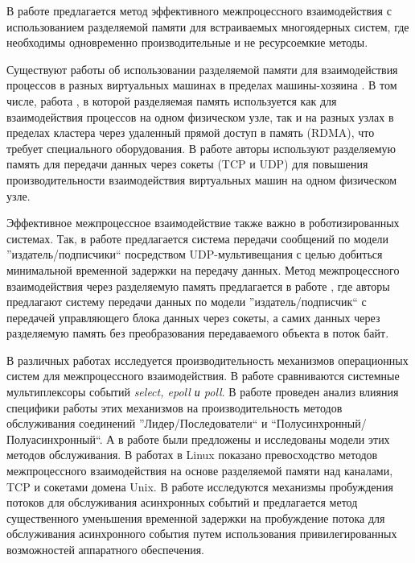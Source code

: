 В работе \cite{HPCInterCoreLinux} предлагается метод эффективного межпроцессного взаимодействия с использованием разделяемой памяти для встраиваемых многоядерных систем, где необходимы одновременно производительные и не ресурсоемкие методы.

Существуют работы об использовании разделяемой памяти для взаимодействия процессов в разных виртуальных машинах в пределах машины-хозяина \cite{IPCInterVirtualMachineShmem, IPCInterVirtualMachineShmemOptimizations, 10.1145/2847562, 10.1007/978-3-642-00955-6_7}. В том числе, работа \cite{234795}, в которой разделяемая память используется как для взаимодействия процессов на одном физическом узле, так и на разных узлах в пределах кластера через удаленный прямой доступ в память (RDMA), что требует специального оборудования. В работе \cite{7416013} авторы используют разделяемую память для передачи данных через сокеты (TCP и UDP) для повышения производительности взаимодействия виртуальных машин на одном физическом узле.

Эффективное межпроцессное взаимодействие также важно в роботизированных системах. Так, в работе \cite{5649358} предлагается система передачи сообщений по модели ''издатель/подписчики`` посредством UDP-мультивещания с целью добиться минимальной временной задержки на передачу данных. Метод межпроцессного взаимодействия через разделяемую память предлагается в работе \cite{Wang2019TZCEI}, где авторы предлагают систему передачи данных по модели ''издатель/подписчик`` с передачей управляющего блока данных через сокеты, а самих данных через разделяемую память без преобразования передаваемого объекта в поток байт.

В различных работах исследуется производительность механизмов операционных систем для межпроцессного взаимодействия. В работе \cite{MuxComparison} сравниваются системные мультиплексоры событий \textit{select, epoll и poll}. В работе \cite{AnalysisOfEventProcDesignPatterns} проведен анализ влияния специфики работы этих механизмов на производительность методов обслуживания соединений ''Лидер/Последователи`` и ``Полусинхронный/Полуасинхронный``. А в работе \cite{6298185} были предложены и исследованы модели этих методов обслуживания.
В работах \cite{Smith2012DraftH, venkataraman2015evaluation} в Linux показано превосходство методов межпроцессного взаимодействия на основе разделяемой памяти над каналами, TCP и сокетами домена Unix.
В работе \cite{8526899} исследуются механизмы пробуждения потоков для обслуживания асинхронных событий и предлагается метод существенного уменьшения временной задержки на пробуждение потока для обслуживания асинхронного события путем использования привилегированных возможностей аппаратного обеспечения.

